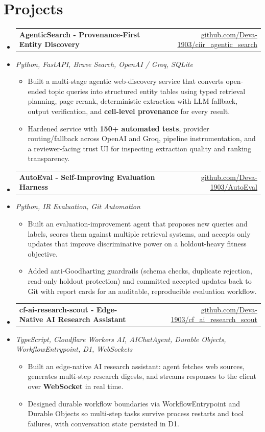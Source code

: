 \documentclass[letterpaper,10pt]{article}
\makeatletter
\newcommand{\resumeItem}[1]{
  \item\small{#1\vspace{-1pt}}
}
\newcommand{\resumeProjectHeading}[2]{
    \item
    \begin{tabular*}{0.985\textwidth}[t]{l@{\extracolsep{\fill}}r}
      \small\textbf{#1} & \small #2 \\
    \end{tabular*}\vspace{-5pt}
}
\newcommand{\resumeProjectSubheading}[1]{
  \vspace{-2pt}\item[] {\small\textcolor{ResumeSlate}{\emph{#1}}}\vspace{-3pt}
}
\newcommand{\resumeSubHeadingListStart}{\begin{itemize}[leftmargin=0.0in, label={}, itemsep=2pt, topsep=2pt]}
\newcommand{\resumeSubHeadingListEnd}{\end{itemize}}
\newcommand{\resumeItemListStart}{\begin{itemize}[leftmargin=0.18in, itemsep=2pt, topsep=1pt]}
\newcommand{\resumeItemListEnd}{\end{itemize}\vspace{-4pt}}
\makeatother
\begin{document}
\section{Projects}
\resumeSubHeadingListStart
  \resumeProjectHeading
    {AgenticSearch - Provenance-First Entity Discovery}
    {\href{https://github.com/Deva-1903/ciir_agentic_search}{github.com/Deva-1903/ciir\_agentic\_search}}
  \resumeProjectSubheading{Python, FastAPI, Brave Search, OpenAI / Groq, SQLite}
    \resumeItemListStart
      \resumeItem{Built a multi-stage agentic web-discovery service that converts open-ended topic queries into structured entity tables using typed retrieval planning, page rerank, deterministic extraction with LLM fallback, output verification, and \textbf{cell-level provenance} for every result.}
      \resumeItem{Hardened service with \textbf{150+ automated tests}, provider routing/fallback across OpenAI and Groq, pipeline instrumentation, and a reviewer-facing trust UI for inspecting extraction quality and ranking transparency.}
    \resumeItemListEnd
  \resumeProjectHeading
    {AutoEval - Self-Improving Evaluation Harness}
    {\href{https://github.com/Deva-1903/AutoEval}{github.com/Deva-1903/AutoEval}}
  \resumeProjectSubheading{Python, IR Evaluation, Git Automation}
    \resumeItemListStart
      \resumeItem{Built an evaluation-improvement agent that proposes new queries and labels, scores them against multiple retrieval systems, and accepts only updates that improve discriminative power on a holdout-heavy fitness objective.}
      \resumeItem{Added anti-Goodharting guardrails (schema checks, duplicate rejection, read-only holdout protection) and committed accepted updates back to Git with report cards for an auditable, reproducible evaluation workflow.}
    \resumeItemListEnd
  \resumeProjectHeading
    {cf-ai-research-scout - Edge-Native AI Research Assistant}
    {\href{https://github.com/Deva-1903/cf_ai_research_scout}{github.com/Deva-1903/cf\_ai\_research\_scout}}
  \resumeProjectSubheading{TypeScript, Cloudflare Workers AI, AIChatAgent, Durable Objects, WorkflowEntrypoint, D1, WebSockets}
    \resumeItemListStart
      \resumeItem{Built an edge-native AI research assistant: agent fetches web sources, generates multi-step research digests, and streams responses to the client over \textbf{WebSocket} in real time.}
      \resumeItem{Designed durable workflow boundaries via WorkflowEntrypoint and Durable Objects so multi-step tasks survive process restarts and tool failures, with conversation state persisted in D1.}
    \resumeItemListEnd
\resumeSubHeadingListEnd
\vspace{-4pt}
\end{document}
